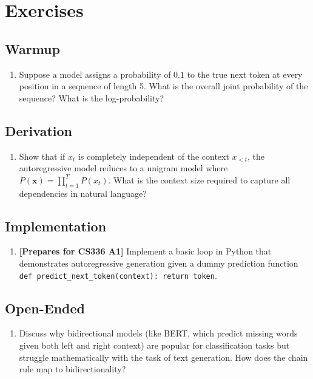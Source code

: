 \section{Exercises}
\label{ch:06:sec:exercises}

\subsection*{Warmup}
\begin{enumerate}
  \item Suppose a model assigns a probability of $0.1$ to the true next token at every position in a sequence of length 5. What is the overall joint probability of the sequence? What is the log-probability?
\end{enumerate}

\subsection*{Derivation}
\begin{enumerate}
  \item Show that if $x_t$ is completely independent of the context $x_{<t}$, the autoregressive model reduces to a unigram model where $P(\mathbf{x}) = \prod_{t=1}^T P(x_t)$. What is the context size required to capture all dependencies in natural language?
\end{enumerate}

\subsection*{Implementation}
\begin{enumerate}
  \item \textbf{[Prepares for CS336 A1]} Implement a basic loop in Python that demonstrates autoregressive generation given a dummy prediction function \texttt{def predict\_next\_token(context): return token}.
\end{enumerate}

\subsection*{Open-Ended}
\begin{enumerate}
  \item Discuss why bidirectional models (like BERT, which predict missing words given both left and right context) are popular for classification tasks but struggle mathematically with the task of text generation. How does the chain rule map to bidirectionality?
\end{enumerate}


